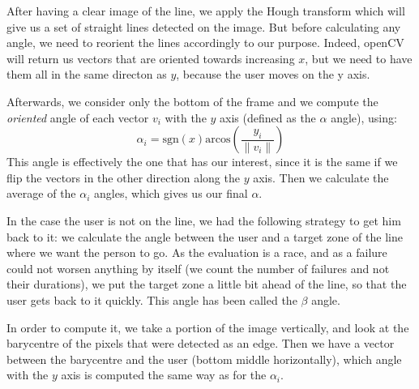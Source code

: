 \documentclass{rapport}
\begin{document}

After having a clear image of the line, we apply the Hough transform which will give us a set of straight lines detected on the image. But before calculating any angle, we need to reorient the lines accordingly to our purpose. Indeed, openCV will return us vectors that are oriented towards increasing \(x\), but we need to have them all in the same directon as \(y\), because the user moves on the y axis.


Afterwards, we consider only the bottom of the frame and we compute the \textit{oriented} angle of each vector \(v_i\) with the \(y\) axis (defined as the \(\alpha\) angle), using:
\[ {\alpha}_i = \text{sgn}(x) \text{arcos}\left(\frac{y_i}{\|v_i\|}\right) \]
This angle is effectively the one that has our interest, since it is the same if we flip the vectors in the other direction along the \(y\) axis.
Then we calculate the average of the \(\alpha_i\) angles, which gives us our final \(\alpha\).

In the case the user is not on the line, we had the following strategy to get him back to it: we calculate the angle between the user and a target zone of the line where we want the person to go. As the evaluation is a race, and as a failure could not worsen anything by itself (we count the number of failures and not their durations), we put the target zone a little bit ahead of the line, so that the user gets back to it quickly. This angle has been called the \(\beta\) angle.

In order to compute it, we take a portion of the image vertically, and look at the barycentre of the pixels that were detected as an edge. Then we have a vector between the barycentre and the user (bottom middle horizontally), which angle with the \(y\) axis is computed the same way as for the \(\alpha_i\).
\end{document}
